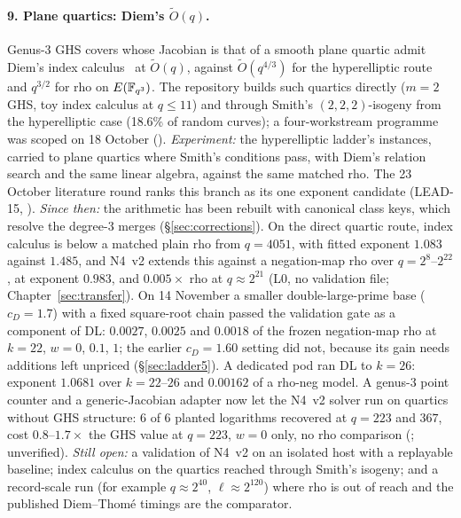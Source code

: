 \paragraph{9. Plane quartics: Diem's $\tilde O(q)$.} Genus-3 GHS covers whose
Jacobian is that of a smooth plane quartic admit Diem's index
calculus~\cite{diem2006,dt2008} at $\tilde O(q)$, against $\tilde O(q^{4/3})$ for
the hyperelliptic route and $q^{3/2}$ for rho on $E(\mathbb{F}_{q^3})$. The
repository builds such quartics directly ($m=2$ GHS, toy index calculus at
$q\le11$) and through Smith's $(2,2,2)$-isogeny from the hyperelliptic case
(18.6\% of random curves); a four-workstream programme was scoped on 18
October ().
\emph{Experiment:} the hyperelliptic ladder's instances, carried to plane
quartics where Smith's conditions pass, with Diem's relation search and the
same linear algebra, against the same matched rho. The 23 October literature
round ranks this branch as its one exponent candidate (LEAD-15,
).
\emph{Since then:} the arithmetic has been rebuilt with canonical class keys,
which resolve the degree-3 merges (\S\ref{sec:corrections}). On the direct
quartic route, index calculus is below a matched plain rho from $q=4051$,
with fitted exponent $1.083$ against $1.485$, and N4~v2 extends this
against a negation-map rho over $q=2^8$--$2^{22}$, at exponent $0.983$,
and $0.005\times$ rho at $q\approx2^{21}$ (L0, no validation file;
Chapter~\ref{sec:transfer}). On 14 November a smaller double-large-prime
base ($c_D=1.7$) with a fixed square-root chain passed the validation gate
as a component of DL: $0.0027$, $0.0025$ and $0.0018$ of the frozen
negation-map rho at $k=22$, $w=0$, $0.1$, $1$; the earlier $c_D=1.60$
setting did not, because its gain needs additions left unpriced
(\S\ref{sec:ladder5}). A dedicated pod ran DL to $k=26$: exponent $1.0681$
over $k=22$--$26$ and $0.00162$ of a rho-neg model. A genus-3 point counter
and a generic-Jacobian adapter now let the N4~v2 solver run on quartics
without GHS structure: 6 of 6 planted logarithms recovered at $q=223$ and
$367$, cost $0.8$--$1.7\times$ the GHS value at $q=223$, $w=0$ only, no rho
comparison (;
unverified). \emph{Still open:} a validation
of N4~v2 on an isolated host with a replayable baseline; index calculus on
the quartics reached through Smith's isogeny; and a record-scale run (for
example $q\approx2^{40}$, $\ell\approx2^{120}$) where rho is out of reach
and the published Diem--Thomé timings are the comparator.

